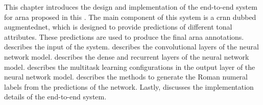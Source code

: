 

This chapter introduces the design and implementation of the
end-to-end system for \gls{arna} proposed in this
\thesisdiss{}. The main component of this system is a
\gls{crnn} dubbed \gls{augmentednet}, which is designed to
provide predictions of different tonal attributes. These
predictions are used to produce the final \gls{arna}
annotations.  describes the input of the
system.  describes the
convolutional layers of the neural network model.
 describes the dense and
recurrent layers of the neural network model.
 describes the multitask
learning configurations in the output layer of the neural
network model.
 describes
the methods to generate the Roman numeral labels from the
predictions of the network. Lastly, 
discusses the implementation details of the end-to-end
system.

